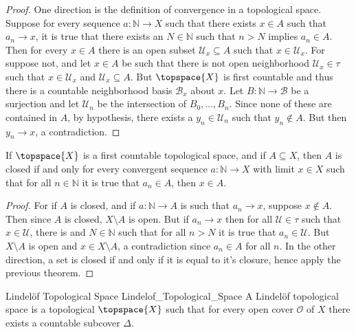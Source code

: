 \documentclass{article}                                                        %
\begin{document}
        \begin{proof}
            One direction is the definition of convergence in a topological
            space. Suppose for every sequence $a:\mathbb{N}\rightarrow{X}$ such
            that there exists $x\in{A}$ such that $a_{n}\rightarrow{x}$, it is
            true that there exists an $N\in\mathbb{N}$ such that $n>N$ implies
            $a_{n}\in{A}$. Then for every $x\in{A}$ there is an open subset
            $\mathcal{U}_{x}\subseteq{A}$ such that $x\in\mathcal{U}_{x}$. For
            suppose not, and let $x\in{A}$ be such that there is not open
            neighborhood $\mathcal{U}_{x}\in\tau$ such that
            $x\in\mathcal{U}_{x}$ and $\mathcal{U}_{x}\subseteq{A}$. But
            $\topspace{X}$ is first countable and thus there is a countable
            neighborhood basis $\mathcal{B}_{x}$ about $x$. Let
            $B:\mathbb{N}\rightarrow\mathcal{B}$ be a surjection and let
            $\mathcal{U}_{n}$ be the intersection of $B_{0},\dots,B_{n}$. Since
            none of these are contained in $A$, by hypothesis, there exists a
            $y_{n}\in\mathcal{U}_{n}$ such that $y_{n}\notin{A}$. But then
            $y_{n}\rightarrow{x}$, a contradiction.
        \end{proof}
        \begin{theorem}
            If $\topspace{X}$ is a first countable topological space, and if
            $A\subseteq{X}$, then $A$ is closed if and only for every convergent
            sequence $a:\mathbb{N}\rightarrow{X}$ with limit $x\in{X}$ such that
            for all $n\in\mathbb{N}$ it is true that $a_{n}\in{A}$, then
            $x\in{A}$.
        \end{theorem}
        \begin{proof}
            For if $A$ is closed, and if $a:\mathbb{N}\rightarrow{A}$ is such
            that $a_{n}\rightarrow{x}$, suppose $x\notin{A}$. Then since $A$ is
            closed, $X\setminus{A}$ is open. But if $a_{n}\rightarrow{x}$ then
            for all $\mathcal{U}\in\tau$ such that $x\in\mathcal{U}$, there is
            and $N\in\mathbb{N}$ such that for all $n>N$ it is true that
            $a_{n}\in\mathcal{U}$. But $X\setminus{A}$ is open and
            $x\in{X}\setminus{A}$, a contradiction since $a_{n}\in{A}$ for all
            $n$. In the other direction, a set is closed if and only if it is
            equal to it's closure, hence apply the previous theorem.
        \end{proof}
        \begin{fdefinition}{Lindel\"{o}f Topological Space}
                           {Lindelof_Topological_Space}
            A Lindel\"{o}f topological space is a topological $\topspace{X}$
            such that for every open cover $\mathcal{O}$ of $X$ there exists a
            countable subcover $\Delta$.
        \end{fdefinition}
\end{document}
